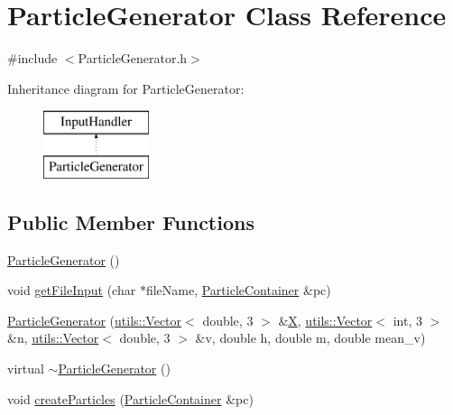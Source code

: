 \hypertarget{classParticleGenerator}{\section{Particle\+Generator Class Reference}
\label{classParticleGenerator}
}


{\ttfamily \#include $<$Particle\+Generator.\+h$>$}

Inheritance diagram for Particle\+Generator\+:\begin{figure}[H]
\begin{center}
\leavevmode
\includegraphics[height=2.000000cm]{classParticleGenerator}
\end{center}
\end{figure}
\subsection*{Public Member Functions}
\begin{DoxyCompactItemize}
\item 
\hyperlink{classParticleGenerator_a66cee361b12e3294bc7a2259d401fe02}{Particle\+Generator} ()
\item 
void \hyperlink{classParticleGenerator_a50dda6873c9f7889c7a1ad2efad65e37}{get\+File\+Input} (char $\ast$file\+Name, \hyperlink{classParticleContainer}{Particle\+Container} \&pc)
\item 
\hyperlink{classParticleGenerator_ae02c12cf87cf295a6fca3688262bb492}{Particle\+Generator} (\hyperlink{singletonutils_1_1Vector}{utils\+::\+Vector}$<$ double, 3 $>$ \&\hyperlink{classParticleGenerator_aaf7df826188798efb4f9ae55daa54a5a}{X}, \hyperlink{singletonutils_1_1Vector}{utils\+::\+Vector}$<$ int, 3 $>$ \&n, \hyperlink{singletonutils_1_1Vector}{utils\+::\+Vector}$<$ double, 3 $>$ \&v, double h, double m, double mean\+\_\+v)
\item 
virtual \hyperlink{classParticleGenerator_a37a629906f87d7200989d6bb2dff796d}{$\sim$\+Particle\+Generator} ()
\item 
void \hyperlink{classParticleGenerator_a56ccab8ea522ff904ed23b92e678211b}{create\+Particles} (\hyperlink{classParticleContainer}{Particle\+Container} \&pc)
\end{DoxyCompactItemize}
